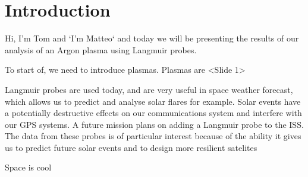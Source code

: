 \section{Introduction}




Hi, I'm Tom and `I'm Matteo` and today we will be presenting the results of our analysis of an Argon plasma using Langmuir probes.

To start of, we need to introduce plasmas. Plasmas are <Slide 1>

Langmuir probes are used today, and are very useful in space weather forecast, which allows us to predict and analyse solar flares for example. Solar events have a potentially destructive effects on our communications system and interfere with our GPS systems. A future mission plans on adding a Langmuir probe to the ISS. The data from these probes is of particular interest because of the ability it gives us to predict future solar events and to design more resilient satelites


Space is cool
